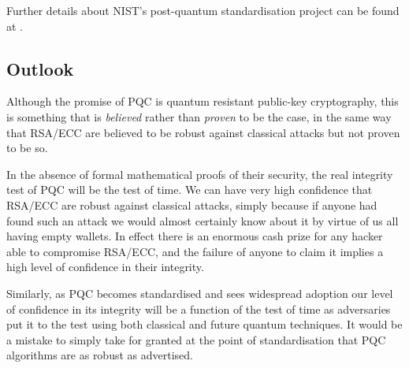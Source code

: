 Further details about NIST's post-quantum standardisation project can be found at \cite{bib:NIST_PQC}.

\subsection{Outlook}

Although the promise of PQC is quantum resistant public-key cryptography, this is something that is \emph{believed} rather than \emph{proven} to be the case, in the same way that RSA/ECC are believed to be robust against classical attacks but not proven to be so.

In the absence of formal mathematical proofs of their security, the real integrity test of PQC will be the test of time. We can have very high confidence that RSA/ECC are robust against classical attacks, simply because if anyone had found such an attack we would almost certainly know about it by virtue of us all having empty wallets. In effect there is an enormous cash prize for any hacker able to compromise RSA/ECC, and the failure of anyone to claim it implies a high level of confidence in their integrity.

Similarly, as PQC becomes standardised and sees widespread adoption our level of confidence in its integrity will be a function of the test of time as adversaries put it to the test using both classical and future quantum techniques. It would be a mistake to simply take for granted at the point of standardisation that PQC algorithms are as robust as advertised.